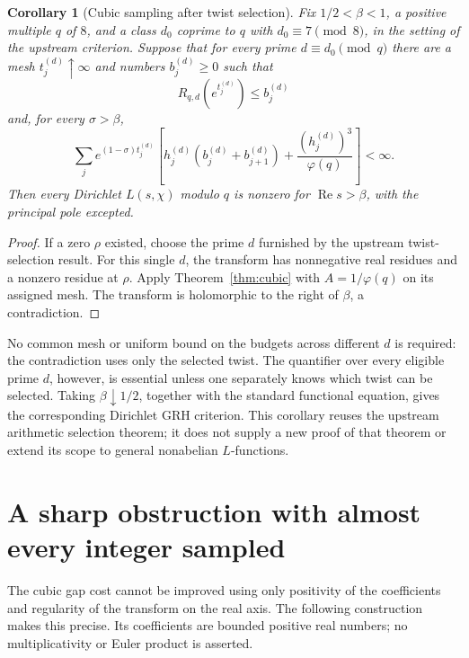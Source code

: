 \documentclass[11pt,a4paper]{article}
\newtheorem{corollary}[theorem]{Corollary}
\theoremstyle{definition}
\theoremstyle{remark}
\numberwithin{equation}{section}
\newcommand{\Rea}{\operatorname{Re}}
\begin{document}
\begin{corollary}[Cubic sampling after twist selection]
\label{cor:Dirichlet}
Fix \(1/2<\beta<1\), a positive multiple \(q\) of \(8\), and a
class \(d_0\) coprime to \(q\) with \(d_0\equiv7\pmod8\), in the
setting of the upstream criterion. Suppose that for every prime
\(d\equiv d_0\pmod q\) there are a mesh
\(t_j^{(d)}\uparrow\infty\) and numbers \(b_j^{(d)}\geq0\) such that
\[
 R_{q,d}(e^{t_j^{(d)}})\leq b_j^{(d)}
\]
and, for every \(\sigma>\beta\),
\[
 \sum_j e^{(1-\sigma)t_j^{(d)}}
 \left[h_j^{(d)}(b_j^{(d)}+b_{j+1}^{(d)})
             +\frac{(h_j^{(d)})^3}{\varphi(q)}\right]<\infty.
\]
Then every Dirichlet \(L(s,\chi)\) modulo \(q\) is nonzero for
\(\Rea s>\beta\), with the principal pole excepted.
\end{corollary}

\begin{proof}
If a zero \(\rho\) existed, choose the prime \(d\) furnished by the
upstream twist-selection result. For this single \(d\), the transform
has nonnegative real residues and a nonzero residue at \(\rho\).
Apply Theorem~\ref{thm:cubic} with \(A=1/\varphi(q)\) on its assigned
mesh. The transform is holomorphic to the right of \(\beta\), a
contradiction.
\end{proof}

No common mesh or uniform bound on the budgets across different
\(d\) is required: the contradiction uses only the selected twist.
The quantifier over every eligible prime \(d\), however, is essential
unless one separately knows which twist can be selected. Taking
\(\beta\downarrow1/2\), together with the standard functional
equation, gives the corresponding Dirichlet GRH criterion. This
corollary reuses the upstream arithmetic selection theorem; it does
not supply a new proof of that theorem or extend its scope to general
nonabelian \(L\)-functions.

\section{A sharp obstruction with almost every integer sampled}
\label{sec:density-one-obstruction}

The cubic gap cost cannot be improved using only positivity of the
coefficients and regularity of the transform on the real axis. The
following construction makes this precise. Its coefficients are bounded
positive real numbers; no multiplicativity or Euler product is asserted.
\end{document}
